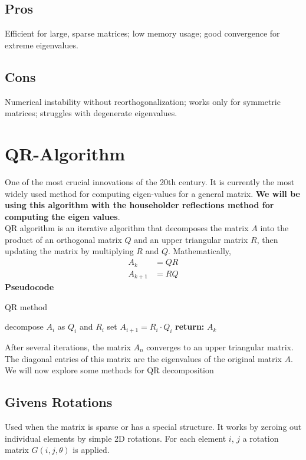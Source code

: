 \documentclass[final]{article}
\begin{document}
\subsection{Pros} Efficient for large, sparse matrices; low memory usage; good convergence for extreme eigenvalues.

\subsection{Cons} Numerical instability without reorthogonalization; works only for symmetric matrices; struggles with degenerate eigenvalues.
        \section{ QR-Algorithm}
        One of the most crucial innovations of the 20th century. It is currently the most widely used method for computing eigen-values for a general matrix. \textbf{We will be using this algorithm with the householder reflections method for computing the eigen values}.\\
        QR algorithm is an iterative algorithm that decomposes the matrix $A$ into the product of an orthogonal matrix $Q$ and an upper triangular matrix $R$, then updating the matrix by multiplying $R$ and $Q$. Mathematically, \\
        \begin{align}
            A_k &= QR \\
            A_{k+1} &= RQ
        \end{align}
            \textbf{Pseudocode}
            \begin{algorithm}
                \caption{QR method}
                \begin{algorithmic}
                        \State decompose $A_i$ as $Q_i$ and $R_i$
                        \State set $A_{i+1} = R_i \cdot Q_i$ 
                    \EndFor
                    \State \textbf{return:} $A_k$
                \end{algorithmic}
            \end{algorithm}
        After several iterations, the matrix $A_n$ converges to an upper triangular matrix. The diagonal entries of this matrix are the eigenvalues of the original matrix $A$. We will now explore some methods for QR decomposition \\
        

        \subsection{Givens Rotations}
            Used when the matrix is sparse or has a special structure. It works by zeroing out individual elements by simple 2D rotations. For each element $i$, $j$ a rotation matrix $G(i, j, \theta)$ is applied. 
\end{document}
